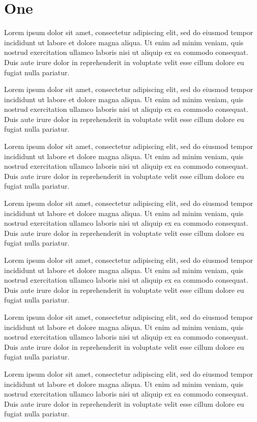 \documentclass{article}
\begin{document}
\section{One}\label{s1}
Lorem ipsum dolor sit amet, consectetur adipiscing elit, sed do eiusmod tempor incididunt ut labore et dolore magna aliqua. Ut enim ad minim veniam, quis nostrud exercitation ullamco laboris nisi ut aliquip ex ea commodo consequat. Duis aute irure dolor in reprehenderit in voluptate velit esse cillum dolore eu fugiat nulla pariatur.

Lorem ipsum dolor sit amet, consectetur adipiscing elit, sed do eiusmod tempor incididunt ut labore et dolore magna aliqua. Ut enim ad minim veniam, quis nostrud exercitation ullamco laboris nisi ut aliquip ex ea commodo consequat. Duis aute irure dolor in reprehenderit in voluptate velit esse cillum dolore eu fugiat nulla pariatur.

Lorem ipsum dolor sit amet, consectetur adipiscing elit, sed do eiusmod tempor incididunt ut labore et dolore magna aliqua. Ut enim ad minim veniam, quis nostrud exercitation ullamco laboris nisi ut aliquip ex ea commodo consequat. Duis aute irure dolor in reprehenderit in voluptate velit esse cillum dolore eu fugiat nulla pariatur.

Lorem ipsum dolor sit amet, consectetur adipiscing elit, sed do eiusmod tempor incididunt ut labore et dolore magna aliqua. Ut enim ad minim veniam, quis nostrud exercitation ullamco laboris nisi ut aliquip ex ea commodo consequat. Duis aute irure dolor in reprehenderit in voluptate velit esse cillum dolore eu fugiat nulla pariatur.

Lorem ipsum dolor sit amet, consectetur adipiscing elit, sed do eiusmod tempor incididunt ut labore et dolore magna aliqua. Ut enim ad minim veniam, quis nostrud exercitation ullamco laboris nisi ut aliquip ex ea commodo consequat. Duis aute irure dolor in reprehenderit in voluptate velit esse cillum dolore eu fugiat nulla pariatur.

Lorem ipsum dolor sit amet, consectetur adipiscing elit, sed do eiusmod tempor incididunt ut labore et dolore magna aliqua. Ut enim ad minim veniam, quis nostrud exercitation ullamco laboris nisi ut aliquip ex ea commodo consequat. Duis aute irure dolor in reprehenderit in voluptate velit esse cillum dolore eu fugiat nulla pariatur.

Lorem ipsum dolor sit amet, consectetur adipiscing elit, sed do eiusmod tempor incididunt ut labore et dolore magna aliqua. Ut enim ad minim veniam, quis nostrud exercitation ullamco laboris nisi ut aliquip ex ea commodo consequat. Duis aute irure dolor in reprehenderit in voluptate velit esse cillum dolore eu fugiat nulla pariatur.
\end{document}
